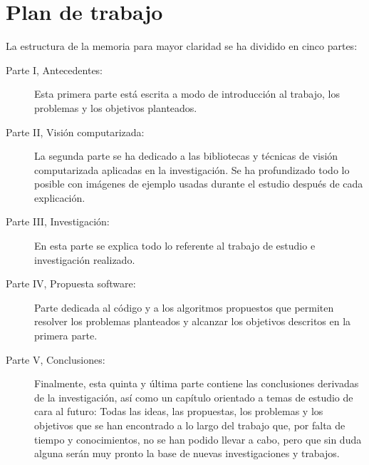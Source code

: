 \chapter{Plan de trabajo}
La estructura de la memoria para mayor claridad se ha dividido en
cinco partes:
\begin{description}
\item[Parte I, Antecedentes:] Esta primera parte está escrita a modo
  de introducción al trabajo, los problemas y los objetivos planteados.
\item[Parte II, Visión computarizada:] La segunda parte se ha
  dedicado a las bibliotecas y técnicas de visión computarizada
  aplicadas en la investigación. Se ha profundizado todo lo
  posible con imágenes de ejemplo usadas durante el estudio después de
  cada explicación.
\item[Parte III, Investigación:] En esta parte se explica
  todo lo referente al trabajo de estudio e investigación realizado.
\item[Parte IV, Propuesta software:] Parte dedicada al código y a los 
  algoritmos propuestos que permiten resolver los problemas planteados 
  y alcanzar los objetivos descritos en la primera parte.
\item[Parte V, Conclusiones:] Finalmente, esta
  quinta y última parte contiene las conclusiones derivadas de la
  investigación, así como un capítulo orientado a temas de estudio
  de cara al futuro: Todas las ideas, las propuestas, los problemas 
  y los objetivos que se han encontrado a lo largo del trabajo que, 
  por falta de tiempo y conocimientos, no se han podido llevar a cabo, 
  pero que sin duda alguna serán muy pronto la base de nuevas investigaciones 
  y trabajos.
\end{description}
